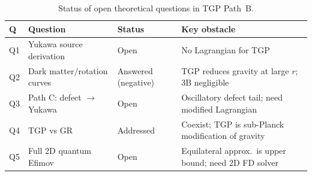 \begin{table}[h]
\centering
\caption{Status of open theoretical questions in TGP Path~B.}
\label{tab:open_status}
\begin{tabular}{p{0.7cm}p{4cm}p{3.5cm}p{4cm}}
\hline
Q & Question & Status & Key obstacle \\
\hline
Q1 & Yukawa source derivation & Open & No Lagrangian for TGP \\
Q2 & Dark matter/rotation curves & Answered (negative) & TGP reduces gravity at large $r$; 3B negligible \\
Q3 & Path C: defect $\to$ Yukawa & Open & Oscillatory defect tail; need modified Lagrangian \\
Q4 & TGP vs GR & Addressed & Coexist; TGP is sub-Planck modification of gravity \\
Q5 & Full 2D quantum Efimov & Open & Equilateral approx.\ is upper bound; need 2D FD solver \\
\hline
\end{tabular}
\end{table}
